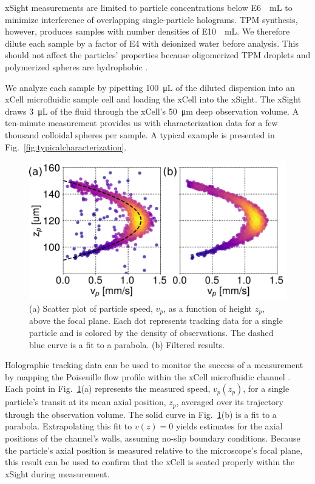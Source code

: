 \documentclass[journal=langd5,manuscript=article,layout=twocolumn]{achemso}
\newcommand{\FIXME}[1]{{\color{red} #1}}
\begin{document}
xSight measurements are limited to particle concentrations
below \SI{E6}{\per\milli\liter} to minimize interference
of overlapping single-particle holograms.
TPM synthesis, however,
produces samples with number densities of \SI{E10}{\per\milli\liter}.
We therefore
dilute each sample by a factor of \num{E4}
with deionized water before analysis.
This should not affect the particles'
properties because oligomerized TPM droplets and 
polymerized spheres are hydrophobic \cite{vanderwel17}.

We analyze each sample by pipetting \SI{100}{\micro\liter} of the diluted
dispersion into an xCell microfluidic sample cell and loading the xCell into the xSight.
The xSight draws \SI{3}{\micro\liter} of the fluid through
the xCell's \SI{50}{\um} deep observation volume.
A ten-minute measurement provides us with
characterization data for a few thousand colloidal spheres per sample.
A typical example is presented in Fig.~\ref{fig:typicalcharacterization}.

\begin{figure}
    \centering
    \includegraphics[width=\columnwidth]{velocity_plots.png}
    \caption{(a) Scatter plot of particle speed, 
      $v_p$, as a function of
      height $z_p$, above the focal plane.  Each dot represents
      tracking data for a single particle and is colored
      by the density of observations. The dashed blue curve
      is a fit to a parabola.
      (b) Filtered results.}
    \label{fig:flow_prof}
\end{figure}

Holographic tracking data can be used to monitor
the success of a measurement by mapping the
Poiseuille flow profile within the xCell microfluidic
channel \cite{cheong10a}.
Each point in Fig.~\ref{fig:flow_prof}(a)
represents the measured speed, $v_p(z_p)$, for a single
particle's transit at its mean axial position, $z_p$,
averaged over its trajectory through the observation volume.
 The solid curve in Fig.~\ref{fig:flow_prof}(b) is a fit to a
parabola. 
Extrapolating this fit to $v(z)=0$ yields estimates
for the axial positions of the channel's walls, assuming
no-slip boundary conditions. 
Because the particle's axial position is measured
relative to the microscope's focal plane, this result
can be used to confirm that the xCell is seated
properly within the xSight during measurement.
\end{document}
